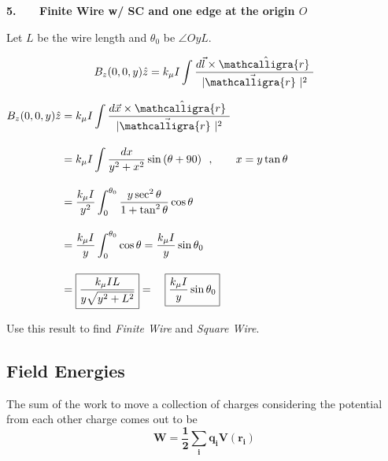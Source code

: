 \documentclass[12pt]{article}
\newcommand{\scripty}[1]{\ensuremath{\mathcalligra{#1}}}
\newcommand*{\cursrr}{\scripty{r}\ }
\begin{document}
\begin{minipage}[t]{.48\textwidth}
	\vspace{20pt}	
	\textbf{5. \ \ \ Finite Wire w/ SC and one edge at the origin \(O\)}
	
	\vspace{10pt}	
	Let \(L\) be the wire length and \(\theta_0\) be \(\angle OyL\).

	\vspace{5pt}
	\[ \displaystyle B_z(0,0,y) \hat{z} = k_\mu I \int \frac{ d\vec{l} \times \hat{\cursrr} }{| \vec{\cursrr} |^2}\]

	\vspace{10pt}
	\(\begin{aligned}
		B_z(0,0,y) \hat{z}&= k_\mu I \int \frac{ d\vec{x} \times \hat{\cursrr} }{| \vec{\cursrr} |^2}\\[10pt]
		&= k_\mu I \int \frac{dx}{y^2 + x^2} \sin{(\theta+90)}
			\ \ , \hspace{20pt} x = y \tan{\theta}\\[10pt]
			&= \frac{k_\mu I}{y^2} \int_0^{\theta_0} \frac{y \sec^2{\theta}}{1 + \tan^2{\theta}} \cos{\theta}\\[10pt]
			&= \frac{k_\mu I}{y} \int_0^{\theta_0} \cos{\theta} = \frac{k_\mu I}{y} \sin{\theta_0} \\[10pt]
			&= \boxed{ \frac{k_\mu I L}{y \sqrt{y^2+L^2}} } = \quad \boxed{ \frac{k_\mu I}{y} \sin{\theta_0}}
	\end{aligned}\)

	\vspace{30pt}
	Use this result to find \textit{Finite Wire} and \textit{Square Wire}.
\end{minipage}

\newpage
\subsection{Field Energies}
The sum of the work to move a collection of charges considering 
the potential from each other charge comes out to be
\[ \boldsymbol{ W = \frac{1}{2} \sum_i q_i V(r_i) } \]
\end{document}
